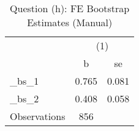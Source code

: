 \begin{table}[htbp]\centering
\def\sym#1{\ifmmode^{#1}\else\(^{#1}\)\fi}
\caption{Question (h): FE Bootstrap Estimates (Manual)}
\begin{tabular}{l*{1}{cc}}
\toprule
                    &\multicolumn{2}{c}{(1)}  \\
                    &           b&          se\\
\midrule
\_bs\_1               &       0.765&       0.081\\
\_bs\_2               &       0.408&       0.058\\
\midrule
Observations        &         856&            \\
\bottomrule
\end{tabular}
\end{table}
